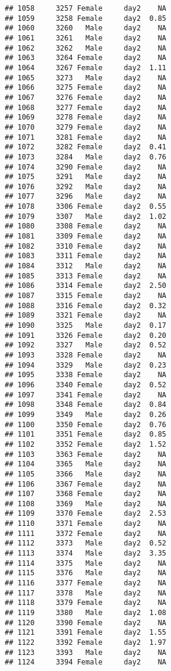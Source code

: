 \documentclass[
]{article}
\begin{document}
\begin{verbatim}
## 1058     3257 Female     day2    NA
## 1059     3258 Female     day2  0.85
## 1060     3260   Male     day2    NA
## 1061     3261   Male     day2    NA
## 1062     3262   Male     day2    NA
## 1063     3264 Female     day2    NA
## 1064     3267 Female     day2  1.11
## 1065     3273   Male     day2    NA
## 1066     3275 Female     day2    NA
## 1067     3276 Female     day2    NA
## 1068     3277 Female     day2    NA
## 1069     3278 Female     day2    NA
## 1070     3279 Female     day2    NA
## 1071     3281 Female     day2    NA
## 1072     3282 Female     day2  0.41
## 1073     3284   Male     day2  0.76
## 1074     3290 Female     day2    NA
## 1075     3291   Male     day2    NA
## 1076     3292   Male     day2    NA
## 1077     3296   Male     day2    NA
## 1078     3306 Female     day2  0.55
## 1079     3307   Male     day2  1.02
## 1080     3308 Female     day2    NA
## 1081     3309 Female     day2    NA
## 1082     3310 Female     day2    NA
## 1083     3311 Female     day2    NA
## 1084     3312   Male     day2    NA
## 1085     3313 Female     day2    NA
## 1086     3314 Female     day2  2.50
## 1087     3315 Female     day2    NA
## 1088     3316 Female     day2  0.32
## 1089     3321 Female     day2    NA
## 1090     3325   Male     day2  0.17
## 1091     3326 Female     day2  0.20
## 1092     3327   Male     day2  0.52
## 1093     3328 Female     day2    NA
## 1094     3329   Male     day2  0.23
## 1095     3338 Female     day2    NA
## 1096     3340 Female     day2  0.52
## 1097     3341 Female     day2    NA
## 1098     3348 Female     day2  0.84
## 1099     3349   Male     day2  0.26
## 1100     3350 Female     day2  0.76
## 1101     3351 Female     day2  0.85
## 1102     3352 Female     day2  1.52
## 1103     3363 Female     day2    NA
## 1104     3365   Male     day2    NA
## 1105     3366   Male     day2    NA
## 1106     3367 Female     day2    NA
## 1107     3368 Female     day2    NA
## 1108     3369   Male     day2    NA
## 1109     3370 Female     day2  2.53
## 1110     3371 Female     day2    NA
## 1111     3372 Female     day2    NA
## 1112     3373   Male     day2  0.52
## 1113     3374   Male     day2  3.35
## 1114     3375   Male     day2    NA
## 1115     3376   Male     day2    NA
## 1116     3377 Female     day2    NA
## 1117     3378   Male     day2    NA
## 1118     3379 Female     day2    NA
## 1119     3380   Male     day2  1.08
## 1120     3390 Female     day2    NA
## 1121     3391 Female     day2  1.55
## 1122     3392 Female     day2  1.97
## 1123     3393   Male     day2    NA
## 1124     3394 Female     day2    NA

\end{verbatim}
\end{document}
